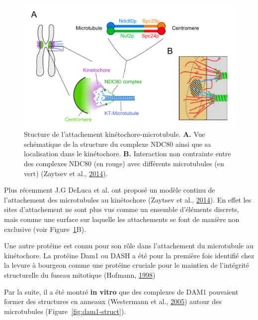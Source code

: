 \documentclass[12pt,a4paper,twoside,openright]{book}
\begin{document}
\begin{figure}[htbp]
\centering
\includegraphics{figures/intro/ndc80.png}
\caption[Stucture de l'attachement kinétochore-microtubule]{\label{fig:ndc80}Stucture
de l'attachement kinétochore-microtubule. \textbf{A.} Vue schématique de
la structure du complexe NDC80 ainsi que sa localisation dans le
kinétochore. \textbf{B.} Interaction non contrainte entre des complexes
NDC80 (en rouge) avec différents microtubules (en vert) (Zaytsev et al.,
\protect\hyperlink{ref-Zaytsev2014}{2014}).}
\end{figure}

Plus récemment J.G DeLuca et al. ont proposé un modèle continu de
l'attachement des microtubules au kinétochore (Zaytsev et al.,
\protect\hyperlink{ref-Zaytsev2014}{2014}). En effet les sites
d'attachement ne sont plus vus comme un ensemble d'éléments discrets,
mais comme une surface sur laquelle les attachements se font de manière
non exclusive (voir Figure~\ref{fig:ndc80}B).

Une autre protéine est connu pour son rôle dans l'attachement du
microtubule au kinétochore. La protéine Dam1 ou DASH a été pour la
première fois identifié chez la levure à bourgeon comme une protéine
cruciale pour le maintien de l'intégrité structurelle du fuseau
mitotique (Hofmann, \protect\hyperlink{ref-Hofmann1998}{1998})

Par la suite, il a été montré \textbf{in vitro} que des complexes de
DAM1 pouvaient former des structures en anneaux (Westermann et al.,
\protect\hyperlink{ref-Westermann2005}{2005}) autour des microtubules
(Figure~\ref{fig:dam1-struct}).
\end{document}
